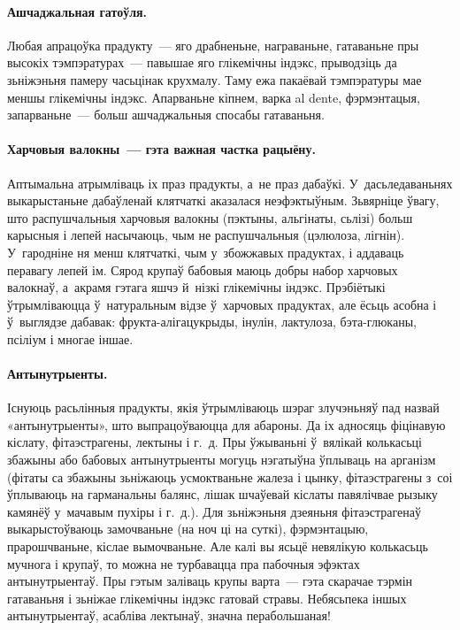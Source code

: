 \paragraph{Ашчаджальная гатоўля.}
Любая апрацоўка прадукту~--- яго драбненьне, награваньне, гатаваньне пры высокіх тэмпэратурах~--- павышае яго глікемічны індэкс, прыводзіць да зьніжэньня памеру часьцінак крухмалу. Таму ежа пакаёвай тэмпэратуры мае меншы глікемічны індэкс. Апарваньне кіпнем, варка al dente, фэрмэнтацыя, запарваньне~--- больш ашчаджальныя спосабы гатаваньня.

\paragraph{Харчовыя валокны~--- гэта важная частка рацыёну.}
Аптымальна атрымліваць іх праз прадукты, а~не праз дабаўкі. У~дасьледаваньнях выкарыстаньне дабаўленай клятчаткі аказалася неэфэктыўным. Зьвярніце ўвагу, што распушчальныя харчовыя валокны (пэктыны, альгінаты, сьлізі) больш карысныя і лепей насычаюць, чым не распушчальныя (цэлюлоза, лігнін). У~гародніне ня менш клятчаткі, чым у~збожжавых прадуктах, і аддаваць перавагу лепей ім. Сярод крупаў бабовыя маюць добры набор харчовых валокнаў, а~акрамя гэтага яшчэ й~нізкі глікемічны індэкс. Прэбіётыкі ўтрымліваюцца ў~натуральным відзе ў~харчовых прадуктах, але ёсьць асобна і ў~выглядзе дабавак: фрукта-алігацукрыды, інулін, лактулоза, бэта-глюканы, псіліум і многае іншае.

\paragraph{Антынутрыенты.}
Існуюць расьлінныя прадукты, якія ўтрымліваюць шэраг злучэньняў пад назвай «антынутрыенты», што выпрацоўваюцца для абароны. Да іх адносяць фіцінавую кіслату, фітаэстрагены, лектыны і г.~д. Пры ўжываньні ў~вялікай колькасьці збажыны або бабовых антынутрыенты могуць нэгатыўна ўплываць на арганізм (фітаты са збажыны зьніжаюць усмоктваньне жалеза і цынку, фітаэстрагены з~соі ўплываюць на гарманальны балянс, лішак шчаўевай кіслаты павялічвае рызыку камянёў у~мачавым пухіры і г.~д.). Для зьніжэньня дзеяньня фітаэстрагенаў выкарыстоўваюць замочваньне (на ноч ці на суткі), фэрмэнтацыю, прарошчваньне, кіслае вымочваньне. Але калі вы ясьцё невялікую колькасьць мучнога і крупаў, то можна не турбавацца пра пабочныя эфэктах антынутрыентаў. Пры гэтым заліваць крупы варта~--- гэта скарачае тэрмін гатаваньня і зьніжае глікемічны індэкс гатовай стравы. Небясьпека іншых антынутрыентаў, асабліва лектынаў, значна перабольшаная!

